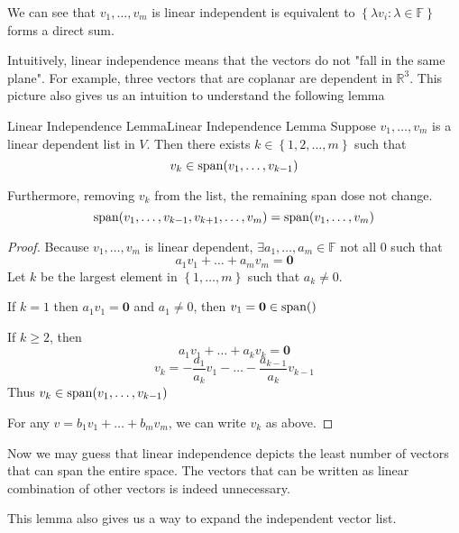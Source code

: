 \documentclass[../main.tex]{subfiles}
\begin{document}
\begin{remark}
We can see that $v_1, \ldots ,v_m$ is linear independent is equivalent to $\left\{ \lambda v_i : \lambda \in \mathbb{F} \right\}$ forms a direct sum.

Intuitively, linear independence means that the vectors do not "fall in the same plane". For example, three vectors that are coplanar are dependent in $\mathbb{R}^3$. This picture also gives us an intuition to understand the following lemma
\end{remark}

\begin{lemma}{Linear Independence Lemma}{Linear Independence Lemma}
Suppose $v_1, \ldots ,v_m$ is a linear dependent list in $V$. Then there exists $k \in \left\{ 1,2, \ldots ,m \right\}$ such that
\begin{equation}
v_k \in \operatorname{span}(v_1, \ldots ,v_{k-1})
\end{equation}

Furthermore, removing $v_k$ from the list, the remaining span dose not change.
\begin{equation}
\operatorname{span}(v_1, \ldots ,v_{k-1},v_{k+1}, \ldots ,v_m) = \operatorname{span} (v_1, \ldots ,v_m)
\end{equation}
\end{lemma}
\begin{proof}
Because $v_1, \ldots ,v_m$ is linear dependent, $\exists a_1, \ldots ,a_m \in \mathbb{F}$ not all $0$ such that 
\begin{equation*}
a_1v_1+\ldots +a_mv_m=\boldsymbol{0}
\end{equation*}
Let $k$ be the largest element in $\left\{ 1, \ldots ,m \right\}$ such that $a_k \neq 0$.

If $k=1$ then $a_1v_1=\boldsymbol{0}$ and $a_1 \neq 0$, then $v_1 = \boldsymbol{0} \in \operatorname{span}()$

If $k\geq 2$, then
\begin{equation*}
a_1v_1+\ldots +a_kv_k=\boldsymbol{0}
\end{equation*}
\begin{equation}
v_k = -\frac{a_1}{a_k}v_1-\ldots -\frac{a_{k-1}}{a_k}v_{k-1}
\end{equation}
Thus $v_k \in \operatorname{span}(v_1, \ldots ,v_{k-1})$

For any $v = b_1v_1+ \ldots +b_mv_m$, we can write $v_k$ as above.
\end{proof}
\begin{remark}
Now we may guess that linear independence depicts the least number of vectors that can span the entire space. The vectors that can be written as linear combination of other vectors is indeed unnecessary.

This lemma also gives us a way to expand the independent vector list.
\end{remark}
\end{document}
